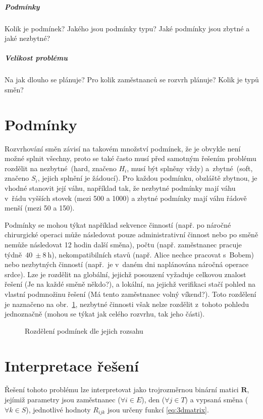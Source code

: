 \documentclass[twoside]{ctuthesis}
\begin{document}
\subparagraph{Podmínky}
Kolik je podmínek? Jakého jsou podmínky typu? Jaké podmínky jsou zbytné a jaké nezbytné?

\subparagraph{Velikost problému}
Na jak dlouho se plánuje? Pro kolik zaměstnanců se rozvrh plánuje? Kolik je typů směn?


\section{Podmínky}
\label{sec:constraints}
Rozvrhování směn závisí na takovém množství podmínek, že je obvykle není možné splnit všechny, proto se také často musí před samotným řešením problému rozdělit na nezbytné~(hard, značeno $H_i$, musí být splněny vždy) a~zbytné~(soft, značeno $S_i$, jejich splnění je žádoucí). \cite{todorovic2012bee} Pro každou podmínku, obzláště zbytnou, je vhodné stanovit její váhu, například tak, že nezbytné podmínky mají váhu v~řádu vyšších stovek (mezi 500 a 1000) a zbytné podmínky mají váhu řádově menší (mezi 50 a 150). \cite{buyukozkan2014applicability}

Podmínky se mohou týkat například sekvence činností (např. po náročné chirurgické operaci může následovat pouze administrativní činnost nebo po směně nemůže následovat 12 hodin další směna), počtu (např. zaměstnanec pracuje týdně~$ 40~\pm 8~\mbox{h}$), nekompatibilních stavů (např. Alice nechce pracovat s~Bobem) nebo nezbytných činností (např.~je v~daném dni naplánována náročná operace srdce). Lze je rozdělit na globální, jejichž posouzení vyžaduje celkovou znalost řešení (Je na každé směně někdo?), a lokální, na jejichž verifikaci stačí pohled na vlastní podmnožinu řešení (Má tento zaměstnanec volný víkend?). Toto rozdělení je naznačeno na obr.~\ref{fig:constraints}, nezbytné činnosti však nelze rozdělit z~tohoto pohledu jednoznačně (mohou se týkat jak celého rozvrhu, tak jeho části). \cite{blochliger2004modeling}

\begin{figure}[h]
	
	\caption{Rozdělení podmínek dle jejich rozsahu}
	\label{fig:constraints}
\end{figure}

\newpage
\section{Interpretace řešení}
Řešení tohoto problému lze interpretovat jako trojrozměrnou binární matici $\boldsymbol{R}$, jejímiž parametry jsou zaměstnanec ($\forall i \in E$), den ($\forall j \in T$) a vypsaná směna ($\forall k \in S$), jednotlivé hodnoty $R_{ijk}$ jsou určeny funkcí \ref{eq:3dmatrix}. \cite{vaclavik2016roster}
\end{document}
